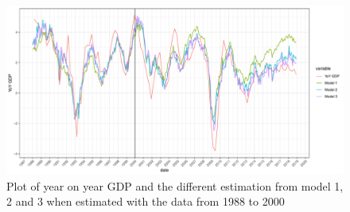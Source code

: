 \documentclass[12pt,a4paper,oneside]{book}
\begin{document}
\begin{figure}[H]
    \centering
    \includegraphics[scale=0.5]{Graphs/predictions2.pdf}
    \caption{Plot of year on year GDP and the different estimation from model 1, 2 and 3 when estimated with the data from 1988 to 2000}
    \label{fig:predictions2}
\end{figure}
\end{document}

